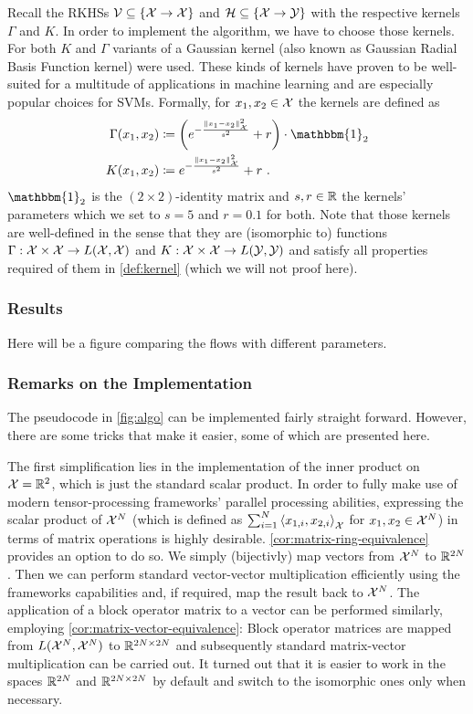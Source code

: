Recall the RKHSs $\mathcal{V} \subseteq \{\mathcal{X} \rightarrow \mathcal{X}\}$ and $\mathcal{H} \subseteq \{\mathcal{X} \rightarrow \mathcal{Y}\}$ with the respective kernels $\Gamma$ and $K$.
In order to implement the algorithm, we have to choose those kernels.
For both $K$ and $\Gamma$ variants of a Gaussian kernel (also known as Gaussian Radial Basis Function kernel) were used.
These kinds of kernels have proven to be well-suited for a multitude of applications in machine learning and are especially popular choices for SVMs. 
Formally, for $x_1, x_2 \in \mathcal{X}$ the kernels are defined as
\begin{align}
	\Gamma(x_1, x_2) &\coloneqq \left(e^{-\frac{\norm{x_1 - x_2}_\cX^2}{s^2}} + r\right) \cdot \mathbbm{1}_2\\
	K(x_1, x_2) &\coloneqq e^{-\frac{\norm{x_1 - x_2}_\cX^2}{s^2}} + r \ .
\end{align}
$\mathbbm{1}_2$ is the $(2\times2)$-identity matrix and $s, r \in \mathbb{R}$ the kernels' parameters which we set to $s = 5$ and $r = 0.1$ for both.
Note that those kernels are well-defined in the sense that they are (isomorphic to) functions $\Gamma: \mathcal{X} \times \mathcal{X} \rightarrow L(\mathcal{X}, \mathcal{X})$ and $K: \mathcal{X} \times \mathcal{X} \rightarrow L(\mathcal{Y}, \mathcal{Y})$ and satisfy all properties required of them in \cref{def:kernel} (which we will not proof here).


\subsubsection{Results}

Here will be a figure comparing the flows with different parameters.

\subsubsection{Remarks on the Implementation}

The pseudocode in \cref{fig:algo} can be implemented fairly straight forward.
However, there are some tricks that make it easier, some of which are presented here.

The first simplification lies in the implementation of the inner product on $\mathcal{X} = \mathbb{R}^2$, which is just the standard scalar product.
In order to fully make use of modern tensor-processing frameworks' parallel processing abilities, expressing the scalar product of $\mathcal{X}^N$ (which is defined as $\sum_{i=1}^N \left<x_{1, i}, x_{2, i}\right>_{\mathcal{X}}$ for $x_1, x_2 \in \mathcal{X}^N$) in terms of matrix operations is highly desirable.
\cref{cor:matrix-ring-equivalence} provides an option to do so.
We simply (bijectivly) map vectors from $\mathcal{X}^N$ to $\mathbb{R}^{2N}$.
Then we can perform standard vector-vector multiplication efficiently using the frameworks capabilities and, if required, map the result back to $\mathcal{X}^N$.
The application of a block operator matrix to a vector can be performed similarly, employing \cref{cor:matrix-vector-equivalence}:
Block operator matrices are mapped from $L(\mathcal{X}^N, \mathcal{X}^N)$ to $\mathbb{R}^{2N \times 2N}$ and subsequently standard matrix-vector multiplication can be carried out.
It turned out that it is easier to work in the spaces $\mathbb{R}^{2N}$ and $\mathbb{R}^{2N \times 2N}$ by default and switch to the isomorphic ones only when necessary.

